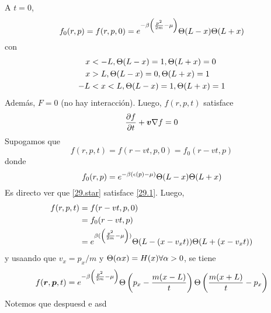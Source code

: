 \begin{sol}
	A $t=0$,
	\begin{equation}
  f_0(r,p)=f(r,p,0)=e^{-\beta\left(\frac{p^2}{2m}-\mu \right)}\Theta (L-x)\Theta(L+x)
\end{equation}
con
\begin{align}
  x&<-L,\Theta(L-x)=1,\Theta(L+x)=0\\
  x&>L,\Theta(L-x)=0,\Theta(L+x)=1\\
  -L&<x<L,\Theta(L-x)=1,\Theta(L+x)=1
\end{align}
Además, $F=0$ (no hay interacción). Luego, $f(r,p,t)$ satisface
\begin{equation}\label{29.1}
  \pdv{f}{t}+\vb*{v}\nabla f=0
\end{equation}
Supogamos que
\begin{equation}\label{29.star}
  f(r,p,t)=f(r-vt,p,0)=f_0(r-vt,p)
\end{equation}
donde
\begin{equation}
  f_0(r,p)=e^{-\beta(\epsilon(p)-\mu )}\Theta(L-x)\Theta(L+x)
\end{equation}
Es directo ver que \eqref{29.star} satisface \eqref{29.1}. Luego,
\begin{align}
  f(r,p,t)&=f(r-vt,p,0)\\
  &=f_0(r-vt,p)\\
  &=e^{\beta(\left(\frac{p^2}{2m}-\mu \right))}\Theta(L-(x-v_xt))\Theta(L+(x-v_xt))
\end{align}
y usaando que $v_x=p_x/m$ y $\Theta(\alpha x)=H(x)\forall \alpha>0$, se tiene
\begin{equation}
  f(\vb*{r},\vb*{p},t)=e^{-\beta\left(\frac{p^2}{2m}-\mu \right)}\Theta\left(p_x-\frac{m(x-L)}{t}\right)\Theta\left(\frac{m(x+L)}{t}-p_x\right)
\end{equation}
Notemos que despuesd e asd 






\end{sol}








